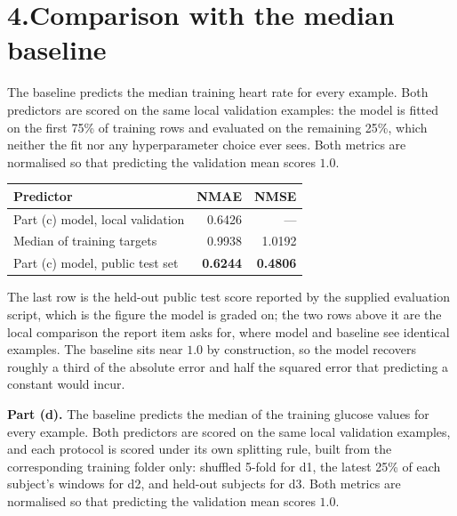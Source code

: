 \documentclass[10pt,a4paper]{article}
\begin{document}

\section*{4.\quad Comparison with the median baseline}

The baseline predicts the median training heart rate for every example. Both predictors
are scored on the same local validation examples: the model is fitted on the first 75\% of
training rows and evaluated on the remaining 25\%, which neither the fit nor any
hyperparameter choice ever sees. Both metrics are normalised so that predicting the
validation mean scores $1.0$.

\begin{table}[h]
\centering\small
\begin{tabular}{@{}lrr@{}}
\toprule
\textbf{Predictor} & \textbf{NMAE} & \textbf{NMSE} \\
\midrule
Part (c) model, local validation    & 0.6426 & --- \\
Median of training targets          & 0.9938 & 1.0192 \\
\midrule
Part (c) model, public test set     & \textbf{0.6244} & \textbf{0.4806} \\
\bottomrule
\end{tabular}
\end{table}

The last row is the held-out public test score reported by the supplied evaluation
script, which is the figure the model is graded on; the two rows above it are the
local comparison the report item asks for, where model and baseline see identical
examples. The baseline sits near $1.0$ by construction, so the model recovers roughly
a third of the absolute error and half the squared error that predicting a constant
would incur.


\textbf{Part (d).} The baseline predicts the median of the training glucose
values for every example. Both predictors are scored on the same local
validation examples, and each protocol is scored under its own splitting rule,
built from the corresponding training folder only: shuffled 5-fold for d1, the
latest 25\% of each subject's windows for d2, and held-out subjects for d3.
Both metrics are normalised so that predicting the validation mean scores $1.0$.
\end{document}
